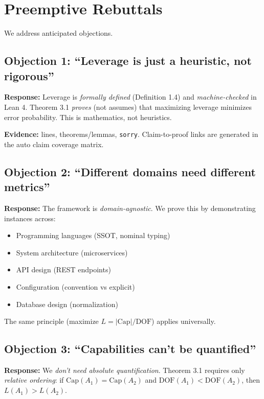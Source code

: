 \section{Preemptive Rebuttals}\label{appendix-rebuttals}

We address anticipated objections.

\subsection{Objection 1: ``Leverage is just a heuristic, not rigorous''}

\textbf{Response:} Leverage is \emph{formally defined} (Definition 1.4) and \emph{machine-checked} in Lean 4. Theorem 3.1 \emph{proves} (not assumes) that maximizing leverage minimizes error probability. This is mathematics, not heuristics.

\textbf{Evidence:} \LeanTotalLines{} lines, \LeanTotalTheorems{} theorems/lemmas, \LeanTotalSorry{} \texttt{sorry}. Claim-to-proof links are generated in the auto claim coverage matrix.

\subsection{Objection 2: ``Different domains need different metrics''}

\textbf{Response:} The framework is \emph{domain-agnostic}. We prove this by demonstrating instances across:
\begin{itemize}
\item Programming languages (SSOT, nominal typing)
\item System architecture (microservices)
\item API design (REST endpoints)
\item Configuration (convention vs explicit)
\item Database design (normalization)
\end{itemize}

The same principle (maximize $L = |\text{Cap}|/\text{DOF}$) applies universally.

\subsection{Objection 3: ``Capabilities can't be quantified''}

\textbf{Response:} We \emph{don't need absolute quantification}. Theorem 3.1 requires only \emph{relative ordering}: if $\text{Cap}(A_1) = \text{Cap}(A_2)$ and $\text{DOF}(A_1) < \text{DOF}(A_2)$, then $L(A_1) > L(A_2)$.

